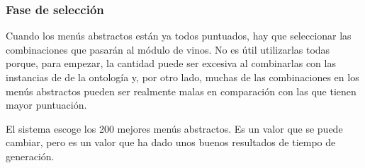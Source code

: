 \subsubsection{Fase de selección}
Cuando los menús abstractos están ya todos puntuados, hay que seleccionar las
combinaciones que pasarán al módulo de vinos. No es útil utilizarlas todas
porque, para empezar, la cantidad puede ser excesiva al combinarlas con las
instancias de  de la ontología y, por otro lado, muchas de las
combinaciones en los menús abstractos pueden ser realmente malas en comparación
con las que tienen mayor puntuación.

El sistema escoge los 200 mejores menús abstractos. Es un valor que se puede
cambiar, pero es un valor que ha dado unos buenos resultados de tiempo de
generación.
